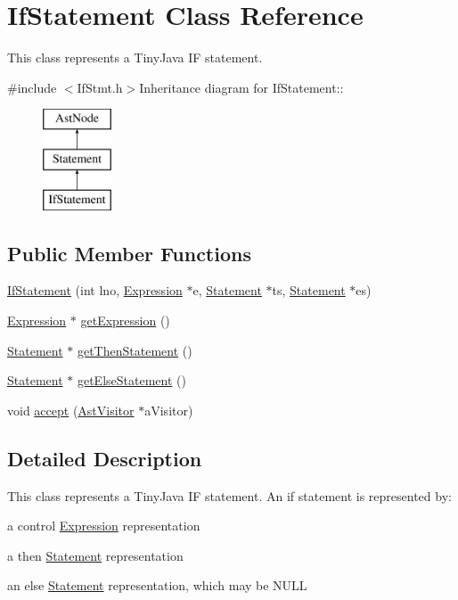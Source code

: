 \hypertarget{classIfStatement}{
\section{IfStatement Class Reference}
\label{classIfStatement}
}


This class represents a TinyJava IF statement.  


{\ttfamily \#include $<$IfStmt.h$>$}Inheritance diagram for IfStatement::\begin{figure}[H]
\begin{center}
\leavevmode
\includegraphics[height=3cm]{classIfStatement}
\end{center}
\end{figure}
\subsection*{Public Member Functions}
\begin{DoxyCompactItemize}
\item 
\hyperlink{classIfStatement_af99bd97270bb7f31932e9ccd3c85d9d3}{IfStatement} (int lno, \hyperlink{classExpression}{Expression} $\ast$e, \hyperlink{classStatement}{Statement} $\ast$ts, \hyperlink{classStatement}{Statement} $\ast$es)
\item 
\hyperlink{classExpression}{Expression} $\ast$ \hyperlink{classIfStatement_aa9a02bb22bf3f74c87fb979aa889d6b6}{getExpression} ()
\item 
\hyperlink{classStatement}{Statement} $\ast$ \hyperlink{classIfStatement_a77b917ab2b788e992f60ab5a1e56678b}{getThenStatement} ()
\item 
\hyperlink{classStatement}{Statement} $\ast$ \hyperlink{classIfStatement_a79a1c2c1a1d824c0160cdef2b9f87478}{getElseStatement} ()
\item 
void \hyperlink{classIfStatement_ab4c2cd2f1c924951d782493281d15249}{accept} (\hyperlink{classAstVisitor}{AstVisitor} $\ast$aVisitor)
\end{DoxyCompactItemize}


\subsection{Detailed Description}
This class represents a TinyJava IF statement. An if statement is represented by:
\begin{DoxyItemize}
\item a control \hyperlink{classExpression}{Expression} representation
\item a then \hyperlink{classStatement}{Statement} representation
\item an else \hyperlink{classStatement}{Statement} representation, which may be NULL 
\end{DoxyItemize}

